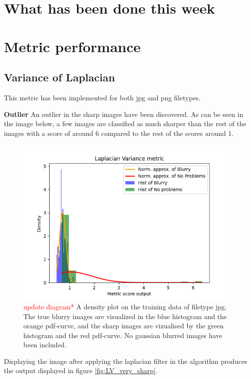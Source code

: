\section*{What has been done this week}


\newpage
\section{Metric performance}


\subsection{Variance of Laplacian}
This metric has been implemented for both jpg and png filetypes.

\textbf{Outlier}
An outlier in the sharp images have been discovered. As can be seen in the image below, a few images are classified as much sharper than the rest of the images with a score of around 6 compared to the rest of the scores around 1.
\begin{figure}[H]
	\centering
    \includegraphics[width=.8\textwidth]{Figures/lv/output_dens_lv_jpg_old.png}
    \caption{\textcolor{red}{update diagram* }A density plot on the training data of filetype jpg. The true blurry images are visualized in the blue histogram and the orange pdf-curve, and the sharp images are vizualised by the green histogram and the red pdf-curve. No gaussian blurred images have been included.}
    \label{fig:LV_dens_jpg_old}
\end{figure}

Displaying the image after applying the laplacian filter in the algorithm produces the output displayed in figure \ref{fig:LV_very_sharp}.


